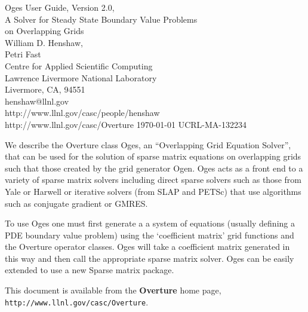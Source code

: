 \documentclass[11pt]{article}
\begin{document}



\newcommand{\figures}{\homeHenshaw/OvertureFigures}


\vspace{5\baselineskip}
\begin{flushleft}
{\Large
Oges User Guide, Version 2.0, \\
A Solver for Steady State Boundary Value Problems \\
on Overlapping Grids \\
}
\vspace{2\baselineskip}
William D. Henshaw, \\
Petri Fast \\
Centre for Applied Scientific Computing \\
Lawrence Livermore National Laboratory    \\
Livermore, CA, 94551   \\
henshaw@llnl.gov \\
http://www.llnl.gov/casc/people/henshaw \\
http://www.llnl.gov/casc/Overture
\vspace{\baselineskip}
\today
\vspace{\baselineskip}
UCRL-MA-132234

\vspace{4\baselineskip}

We describe the Overture class Oges, an
``Overlapping Grid Equation Solver'', that can be used for the
solution of sparse matrix equations on overlapping grids such that
those created by the grid generator Ogen.  Oges acts as a front end to
a variety of sparse matrix solvers including direct sparse solvers
such as those from Yale or Harwell or iterative solvers (from SLAP and
PETSc) that use algorithms such as conjugate gradient or GMRES.

To use Oges one must first generate a a system of equations (usually
defining a PDE boundary value problem) using the `coefficient matrix'
grid functions and the Overture operator classes. Oges will take a
coefficient matrix generated in this way and then call the appropriate
sparse matrix solver.
Oges can be easily extended to use a new Sparse matrix package.

This document is available from the {\bf Overture} home page,
{\tt http://\-www.llnl.gov/\-casc/\-Overture}.

\end{flushleft}
\end{document}
